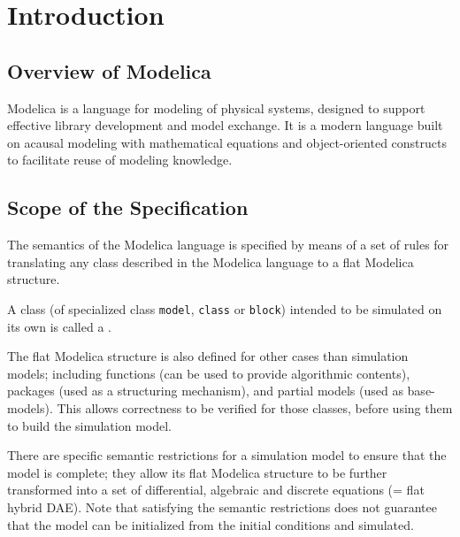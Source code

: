 \chapter{Introduction}\label{introduction1}
\section{Overview of Modelica}\label{overview-of-modelica}
Modelica is a language for modeling of physical systems, designed to
support effective library development and model exchange. It is a modern
language built on acausal modeling with mathematical equations and
object-oriented constructs to facilitate reuse of modeling knowledge.

\section{Scope of the Specification}\label{scope-of-the-specification}

The semantics of the Modelica language is specified by means of a set of
rules for translating any class described in the Modelica language to a
flat Modelica structure.

A class (of specialized class \lstinline!model!, \lstinline!class! or \lstinline!block!) intended to be simulated on its own is called a .

The flat Modelica structure is also defined for other cases than
simulation models; including functions (can be used to provide
algorithmic contents), packages (used as a structuring mechanism), and
partial models (used as base-models). This allows correctness to be
verified for those classes, before using them to build the simulation
model.

There are specific semantic restrictions for a simulation model to
ensure that the model is complete; they allow its flat Modelica
structure to be further transformed into a set of differential,
algebraic and discrete equations (= flat hybrid DAE). Note that
satisfying the semantic restrictions does not guarantee that the model
can be initialized from the initial conditions and simulated.

